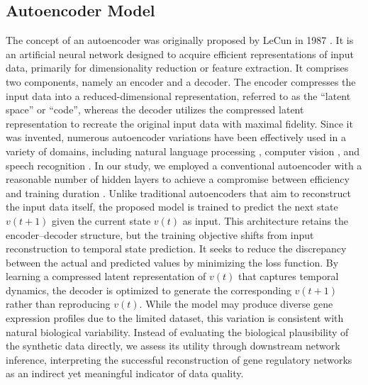 \subsection{Autoencoder Model}
The concept of an autoencoder was originally proposed by LeCun in 1987 \parencite{LeCun1987}. It is an artificial neural network designed to acquire efficient representations of input data, primarily for dimensionality reduction or feature extraction. It comprises two components, namely an encoder and a decoder. The encoder compresses the input data into a reduced-dimensional representation, referred to as the \enquote{latent space} or \enquote{code}, whereas the decoder utilizes the compressed latent representation to recreate the original input data with maximal fidelity. Since it was invented, numerous autoencoder variations have been effectively used in a variety of domains, including natural language processing \parencite{Li2015,Freitag2018,Akram2022}, computer vision \parencite{Zhou2023,Parmar2021,Cheng2018}, and speech recognition \parencite{Vachhani2017,Karita2019}. In our study, we employed a conventional autoencoder with a reasonable number of hidden layers to achieve a compromise between efficiency and training duration \parencite{Geron2022, Song2022}. Unlike traditional autoencoders that aim to reconstruct the input data itself, the proposed model is trained to predict the next state \( v(t+1) \) given the current state \( v(t) \) as input. This architecture retains the encoder--decoder structure, but the training objective shifts from input reconstruction to temporal state prediction. It seeks to reduce the discrepancy between the actual and predicted values by minimizing the loss function. By learning a compressed latent representation of \( v(t) \) that captures temporal dynamics, the decoder is optimized to generate the corresponding \( v(t+1) \) rather than reproducing \( v(t) \). {While the model may produce diverse gene expression profiles due to the limited dataset, this variation is consistent with natural biological variability. Instead of evaluating the biological plausibility of the synthetic data directly, we assess its utility through downstream network inference, interpreting the successful reconstruction of gene regulatory networks as an indirect yet meaningful indicator of data quality.}

